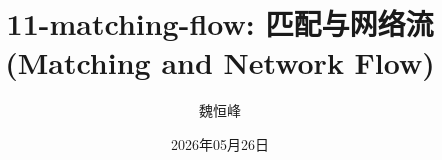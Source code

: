 \documentclass[]{beamer}
\title[11-matching-flow: 匹配与网络流]{11-matching-flow: 匹配与网络流
  \\[3pt] {(Matching and Network Flow)}}
\author[魏恒峰]{\large 魏恒峰}
\institute{hfwei@hnu.edu.cn}
\date{2026年05月26日}
\begin{document}
\maketitle




\thankyou{}

\end{document}
